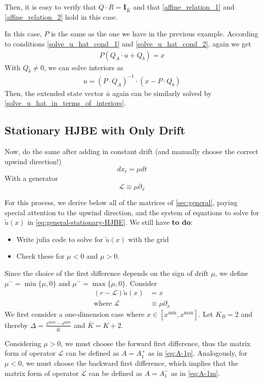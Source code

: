 \documentclass[11pt]{article}
\newcommand{\D}[1][]{\ensuremath{\partial_{#1}}}
\begin{document}
Then, it is easy to verify that $Q \cdot R = \mathbf{I}_{\bar{K}}$ and that \eqref{affine_relation_1} and \eqref{affine_relation_2} hold in this case.

In this case, $P$ is the same as the one we have in the previous example. According to conditions \eqref{solve_u_hat_cond_1} and \eqref{solve_u_hat_cond_2}, again we get
\begin{align}
P(Q_A\cdot u+Q_b) = x
\end{align}
With $Q_b\neq 0$, we can solve interiors as
\begin{align}
u = (P\cdot Q_A)^{-1}\cdot(x-P\cdot Q_b)
\end{align}
Then, the extended state vector $\bar{u}$ again can be similarly solved by \eqref{solve_u_hat_in_terms_of_interiors}.
\subsection{Stationary HJBE with Only Drift}
Now, do the same after adding in constant drift (and manually choose the correct upwind direction!)
$$
d x_t = \mu dt
$$
With a generator
$$
	\mathcal{L} \equiv \mu \D[x]
$$

For this process, we derive below all of the matrices of \cref{sec:general}, paying special attention to the upwind direction, and the system of equations to solve for $\tilde{u}(x)$ in \cref{eq:general-stationary-HJBE}. We still have \textbf{to do}:
\begin{itemize}
	\item Write julia code to solve for $\tilde{u}(x)$ with the grid
	\item Check these for $\mu < 0$ and $\mu > 0$.
\end{itemize}

Since the choice of the first difference depends on the sign of drift $\mu$, we define $\mu^- =\min\{\mu, 0\}$ and $\mu^- =\max\{\mu, 0\}$.
Consider
\begin{align}
(r - \mathcal{L} )\tilde{u}(x) &= x\label{HJBE_PDE_with_drifts}\\
\text{where }\mathcal{L}&\equiv \mu\partial_{x}
\end{align}
We first consider a one-dimension case where $x\in [x^{\min},x^{\max}]$. Let $K_B = 2$ and thereby $\Delta  = \frac{x^{\max}-x^{\min}}{\bar{K}}$ and $\bar{K} = K+2$.

Considering $\mu>0$, we must choose the forward first difference, thus the matrix form of operator $\mathcal{L}$ can be defined as $A = A_1^+$ as in \eqref{eq:A-1p}. Analogously, for $\mu<0$, we must choose the backward first difference, which implies that the matrix form of operator $\mathcal{L}$ can be defined as $A = A_1^-$ as in \eqref{eq:A-1m}. 
\end{document}
